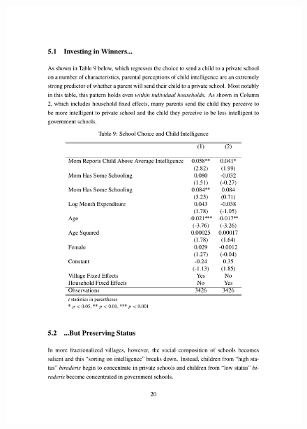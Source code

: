\documentclass[handout]{beamer}
\begin{document}
\begin{frame}{}
	\begin{figure}[htb]
		\begin{center}
		\includegraphics[scale=0.7]{tables/intelligence_type.pdf}
		\end{center}
	\end{figure}
\end{frame}
\end{document}
